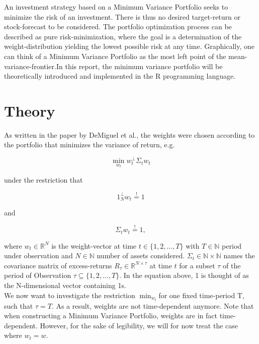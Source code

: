 An investment strategy based on a Minimum Variance Portfolio seeks to minimize the risk of an investment. There is thus no desired target-return or stock-forecast to be considered. The portfolio optimization process can be described as pure risk-minimization, where the goal is a determination of the weight-distribution yielding the lowest possible risk at any time. Graphically, one can think of a Minimum Variance Portfolio as the most left point of the mean-variance-frontier.In this report, the minimum variance portfolio will be theoretically introduced and implemented in the R programming language. 

\section{Theory}
As written in the paper by DeMiguel et al.\cite{DEM09}, the weights were chosen according to the portfolio that minimizes the variance of return, e.g. 

\begin{equation} \label{eq:1}
\min_{w_t} w_t^{\perp}\Sigma_{t}w_{t}
\end{equation}

under the restriction that 

\begin{equation} \label{eq:2}
1_{N}^{\perp}w_{t} \overset{!}{=} 1
\end{equation}

and

\begin{equation} \label{eq:3}
\Sigma_t w_t \overset{!}{=} 1,
\end{equation}

where $w_t \in \mathbb{R}^{N}$ is the weight-vector at time $t \in \lbrace 1, 2, \dots, T \rbrace$ with $T \in \mathbb{N}$ period under observation and $N \in \mathbb{N}$ number of assets considered. $\Sigma_t \in \mathbb{N \times N}$ names the covariance matrix of excess-returns $R_{\tau} \in \mathbb{R}^{N \times \tau}$ at time $t$ for a subset $\tau$ of the period of Observation $\tau \subseteq \lbrace 1, 2, \dots, T \rbrace$. In the equation above, 1 is thought of as the N-dimensional vector containing 1s. \\

We now want to investigate the restriction $\min_{w_t}$for one fixed time-period T, such that $\tau = T$. As a result, weights are not time-dependent anymore. Note that when constructing a Minimum Variance Portfolio, weights are in fact time-dependent. However, for the sake of legibility, we will for now treat the case where $w_t = w$.\\

